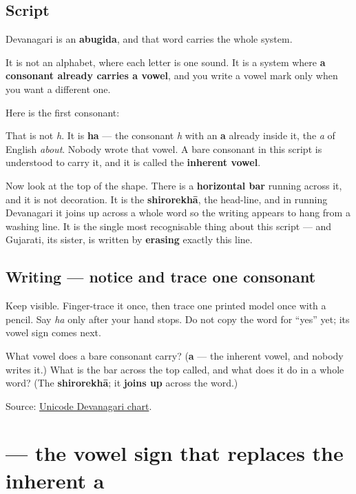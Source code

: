 \subsection*{Script}
Devanagari is an \textbf{abugida}, and that word carries the whole system.

It is not an alphabet, where each letter is one sound. It is a system where \textbf{a consonant already carries a vowel}, and you write a vowel mark only when you want a different one.

Here is the first consonant:

\begin{quote}
\end{quote}

That is not \emph{h}. It is \textbf{ha} — the consonant \emph{h} with an \textbf{a} already inside it, the \emph{a} of English \emph{about}. Nobody wrote that vowel. A bare consonant in this script is understood to carry it, and it is called the \textbf{inherent vowel}.

Now look at the top of the shape. There is a \textbf{horizontal bar} running across it, and it is not decoration. It is the \textbf{shirorekhā}, the head-line, and in running Devanagari it joins up across a whole word so the writing appears to hang from a washing line. It is the single most recognisable thing about this script — and Gujarati, its sister, is written by \textbf{erasing} exactly this line.

\subsection*{Writing — notice and trace one consonant}
Keep \textbf{} visible. Finger-trace it once, then trace one printed model once with a pencil. Say \emph{ha} only after your hand stops. Do not copy the word for \textquotedblleft{}yes\textquotedblright{} yet; its vowel sign comes next.

\begin{tcolorbox}[breakable,colback=teal!4,colframe=teal!35!black,title={Before you move on}]
What vowel does a bare consonant carry? (\textbf{a} — the inherent vowel, and nobody writes it.) What is the bar across the top called, and what does it do in a whole word? (The \textbf{shirorekhā}; it \textbf{joins up} across the word.)

Source: \href{https://www.unicode.org/charts/PDF/U0900.pdf}{Unicode Devanagari chart}.
\end{tcolorbox}
\section[-o]{ — the vowel sign that replaces the inherent a}

